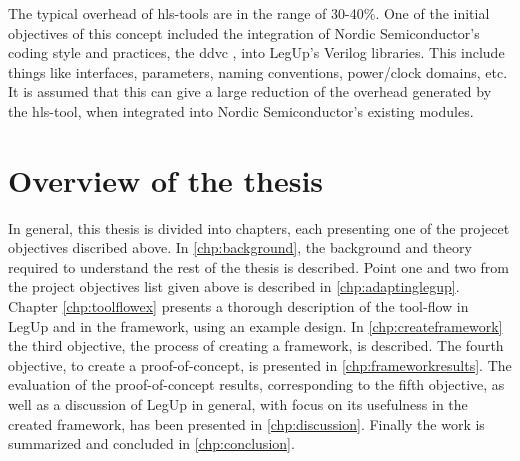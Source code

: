 \begin{enumerate}
 The typical overhead of \gls{hls}-tools are in the range of 30-40\%. One of the initial objectives of this concept included the integration of  Nordic Semiconductor's coding style and practices, the \gls{ddvc} \cite{nordicddvc}, into LegUp's Verilog libraries. This include things like interfaces, parameters, naming conventions, power/clock domains, etc. It is assumed that this can give a large reduction of the overhead generated by the \gls{hls}-tool, when integrated into Nordic Semiconductor's existing modules.
\end{enumerate}

\section{Overview of the thesis}
In general, this thesis is divided into chapters, each presenting one of the projecet objectives discribed above. In \cref{chp:background}, the background and theory required to understand the rest of the thesis is described. Point one and two from the project objectives list given above is described in \cref{chp:adaptinglegup}. Chapter \ref{chp:toolflowex} presents a thorough description of the tool-flow in LegUp and in the framework, using an example design. In \cref{chp:createframework} the third objective, the process of creating a framework, is described. The fourth objective, to create a proof-of-concept, is presented in \cref{chp:frameworkresults}. The evaluation of the proof-of-concept results, corresponding to the fifth objective, as well as a discussion of LegUp in general, with focus on its usefulness in the created framework, has been presented in \cref{chp:discussion}. Finally the work is summarized and concluded in \cref{chp:conclusion}.
